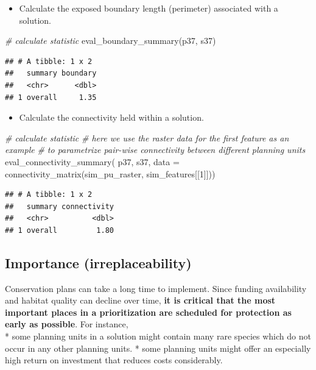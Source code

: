 \documentclass[
  12pt,
]{book}
\newenvironment{Shaded}{\begin{snugshade}}{\end{snugshade}}
\newcommand{\AttributeTok}[1]{\textcolor[rgb]{0.77,0.63,0.00}{#1}}
\newcommand{\CommentTok}[1]{\textcolor[rgb]{0.56,0.35,0.01}{\textit{#1}}}
\newcommand{\DecValTok}[1]{\textcolor[rgb]{0.00,0.00,0.81}{#1}}
\newcommand{\FunctionTok}[1]{\textcolor[rgb]{0.00,0.00,0.00}{#1}}
\newcommand{\NormalTok}[1]{#1}
\providecommand{\tightlist}{%
  \setlength{\itemsep}{0pt}\setlength{\parskip}{0pt}}
\begin{document}
\begin{itemize}
\tightlist
\item
  Calculate the exposed boundary length (perimeter) associated with a solution.
\end{itemize}

\begin{Shaded}
\begin{Highlighting}[]
\CommentTok{\# calculate statistic}
\FunctionTok{eval\_boundary\_summary}\NormalTok{(p37, s37)}
\end{Highlighting}
\end{Shaded}

\begin{verbatim}
## # A tibble: 1 x 2
##   summary boundary
##   <chr>      <dbl>
## 1 overall     1.35
\end{verbatim}

\begin{itemize}
\tightlist
\item
  Calculate the connectivity held within a solution.
\end{itemize}

\begin{Shaded}
\begin{Highlighting}[]
\CommentTok{\# calculate statistic}
\CommentTok{\# here we use the raster data for the first feature as an example}
\CommentTok{\# to parametrize pair{-}wise connectivity between different planning units}
\FunctionTok{eval\_connectivity\_summary}\NormalTok{(}
\NormalTok{  p37, s37, }\AttributeTok{data =} \FunctionTok{connectivity\_matrix}\NormalTok{(sim\_pu\_raster, sim\_features[[}\DecValTok{1}\NormalTok{]]))}
\end{Highlighting}
\end{Shaded}

\begin{verbatim}
## # A tibble: 1 x 2
##   summary connectivity
##   <chr>          <dbl>
## 1 overall         1.80
\end{verbatim}

\hypertarget{importance-irreplaceability}{%
\subsection{Importance (irreplaceability)}\label{importance-irreplaceability}}

Conservation plans can take a long time to implement. Since funding availability and habitat quality can decline over time, \textbf{it is critical that the most important places in a prioritization are scheduled for protection as early as possible}. For instance,\\
* some planning units in a solution might contain many rare species which do not occur in any other planning units.
* some planning units might offer an especially high return on investment that reduces costs considerably.
\end{document}
